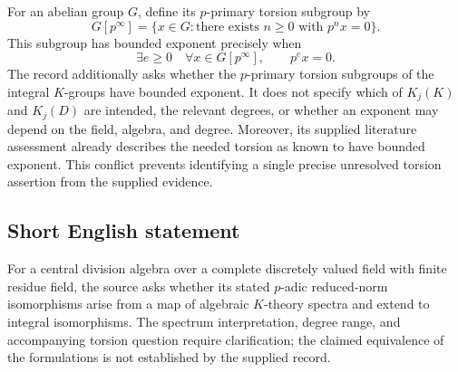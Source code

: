 \documentclass[11pt]{article}
\begin{document}
For an abelian group \(G\), define its \(p\)-primary torsion subgroup by
\[
G[p^\infty]=\{x\in G:\text{there exists }n\geq 0\text{ with }p^n x=0\}.
\]
This subgroup has bounded exponent precisely when
\[
\exists e\geq 0\quad\forall x\in G[p^\infty],\qquad p^e x=0.
\]
The record additionally asks whether the \(p\)-primary torsion subgroups of the integral \(K\)-groups have bounded exponent. It does not specify which of \(K_j(K)\) and \(K_j(D)\) are intended, the relevant degrees, or whether an exponent may depend on the field, algebra, and degree. Moreover, its supplied literature assessment already describes the needed torsion as known to have bounded exponent. This conflict prevents identifying a single precise unresolved torsion assertion from the supplied evidence.
\subsection{Short English statement}
For a central division algebra over a complete discretely valued field with finite residue field, the source asks whether its stated \(p\)-adic reduced-norm isomorphisms arise from a map of algebraic \(K\)-theory spectra and extend to integral isomorphisms. The spectrum interpretation, degree range, and accompanying torsion question require clarification; the claimed equivalence of the formulations is not established by the supplied record.
\end{document}
